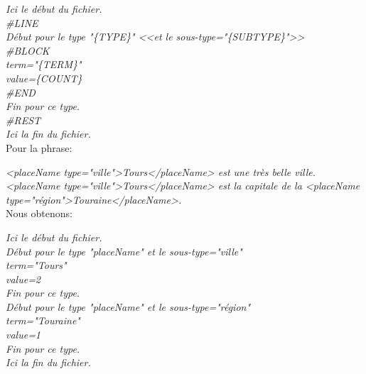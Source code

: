 \bigskip
\noindent \emph{Ici le début du fichier.}\\
\emph{\#LINE}\\
\hspace*{1cm} \emph{Début pour le type "\{TYPE\}" <<et le sous-type="\{SUBTYPE\}">>}\\
\emph{\#BLOCK}\\
\hspace*{1cm} \emph{term="\{TERM\}"}\\
\hspace*{1cm} \emph{value=\{COUNT\}}\\
\emph{\#END}\\
\hspace*{1cm} \emph{Fin pour ce type.}\\
\emph{\#REST}\\
\emph{Ici la fin du fichier.}\\


\noindent Pour la phrase:

\bigskip
\noindent \emph{<placeName type="ville">Tours</placeName> est une très belle ville. <placeName type="ville">Tours</placeName> est la capitale de la <placeName type="région">Touraine</placeName>.}\\

Nous obtenons:

\bigskip
\noindent \emph{Ici le début du fichier.}\\
\hspace*{1cm} \emph{Début pour le type "placeName" et le sous-type="ville"} \\
\hspace*{1cm} \hspace*{1cm} \emph{term="Tours"} \\
\hspace*{1cm} \hspace*{1cm} \emph{value=2} \\
\hspace*{1cm} \emph{Fin pour ce type.}\\
\hspace*{1cm} \emph{Début pour le type "placeName" et le sous-type="région"} \\
\hspace*{1cm} \hspace*{1cm} \emph{term="Touraine"} \\
\hspace*{1cm} \hspace*{1cm} \emph{value=1} \\
\hspace*{1cm} \emph{Fin pour ce type.}\\
\emph{Ici la fin du fichier.}\\

